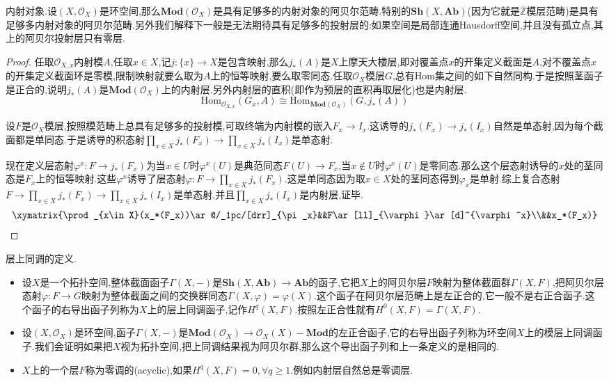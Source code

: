 内射对象.设$(X,\mathscr{O}_X)$是环空间,那么$\textbf{Mod}(\mathscr{O}_X)$是具有足够多的内射对象的阿贝尔范畴.特别的$\textbf{Sh}(X,\textbf{Ab})$(因为它就是$\overline{\mathbb{Z}}$模层范畴)是具有足够多内射对象的阿贝尔范畴.另外我们解释下一般是无法期待具有足够多的投射层的:如果空间是局部连通Hausdorff空间,并且没有孤立点,其上的阿贝尔投射层只有零层.
\begin{proof}
	
	任取$\mathscr{O}_{X,x}$内射模$A$,任取$x\in X$,记$j:\{x\}\to X$是包含映射,那么$j_*(A)$是$X$上摩天大楼层,即对覆盖点$x$的开集定义截面是$A$,对不覆盖点$x$的开集定义截面环是零模,限制映射就要么取为$A$上的恒等映射,要么取零同态.任取$\mathscr{O}_X$模层$G$,总有Hom集之间的如下自然同构.于是按照茎函子是正合的,说明$j_*(A)$是$\textbf{Mod}(\mathscr{O}_X)$上的内射层.另外内射层的直积(即作为预层的直积再取层化)也是内射层.
	$$\mathrm{Hom}_{\mathscr{O}_{X,x}}(G_x,A)\cong\mathrm{Hom}_{\textbf{Mod}(\mathscr{O}_X)}(G,j_*(A))$$
	
	设$F$是$\mathscr{O}_X$模层,按照模范畴上总具有足够多的投射模,可取终端为内射模的嵌入$F_x\to I_x$.这诱导的$j_*(F_x)\to j_*(I_x)$自然是单态射,因为每个截面都是单同态.于是诱导的积态射$\prod_{x\in X}j_*(F_x)\to\prod_{x\in X}j_*(I_x)$是单态射.
	
	\qquad
	
	现在定义层态射$\varphi^x:F\to j_*(F_x)$为当$x\in U$时$\varphi^x(U)$是典范同态$F(U)\to F_x$,当$x\not\in U$时$\varphi^x(U)$是零同态.那么这个层态射诱导的$x$处的茎同态是$F_x$上的恒等映射.这些$\varphi^x$诱导了层态射$\varphi:F\to\prod_{x\in X}j_*(F_x)$.这是单同态因为取$x\in X$处的茎同态得到$\varphi_x$是单射.综上复合态射$F\to\prod_{x\in X}j_*(F_x)\to\prod_{x\in X}j_*(I_x)$是单态射,并且$\prod_{x\in X}j_*(I_x)$是内射层,证毕.
	$$\xymatrix{\prod_{x\in X}(x_*(F_x))\ar@/_1pc/[drr]_{\pi_x}&&F\ar[ll]_{\varphi}\ar[d]^{\varphi^x}\\&&x_*(F_x)}$$
\end{proof}

层上同调的定义.
\begin{itemize}
	\item 设$X$是一个拓扑空间,整体截面函子$\Gamma(X,-)$是$\textbf{Sh}(X,\textbf{Ab})\to\textbf{Ab}$的函子,它把$X$上的阿贝尔层$F$映射为整体截面群$\Gamma(X,F)$,把阿贝尔层态射$\varphi:F\to G$映射为整体截面之间的交换群同态$\Gamma(X,\varphi)=\varphi(X)$.这个函子在阿贝尔层范畴上是左正合的,它一般不是右正合函子.这个函子的右导出函子列称为$X$上的层上同调函子,记作$H^q(X,F)$.按照左正合性就有$H^0(X,F)=\Gamma(X,F)$.
	\item 设$(X,\mathscr{O}_X)$是环空间,函子$\Gamma(X,-)$是$\textbf{Mod}(\mathscr{O}_X)\to\mathscr{O}_X(X)-\textbf{Mod}$的左正合函子,它的右导出函子列称为环空间$X$上的模层上同调函子.我们会证明如果把$X$视为拓扑空间,把上同调结果视为阿贝尔群,那么这个导出函子列和上一条定义的是相同的.
	\item $X$上的一个层$F$称为零调的(acyclic),如果$H^q(X,F)=0,\forall q\ge1$.例如内射层自然总是零调层.
\end{itemize}

